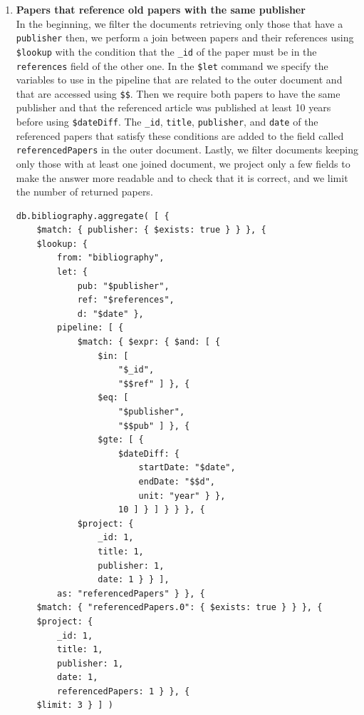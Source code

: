 \begin{enumerate}
\begin{figure}[H]
\begin{center}
            \label{fig:query8mongodb}%
        \end{center}
    \end{figure}
    \item \textbf{Papers that reference old papers with the same publisher} \\
    In the beginning, we filter the documents retrieving only those that have a \verb|publisher| then, we perform a join between papers and their references using \verb|$lookup| with the condition that the \verb|_id| of the paper must be in the \verb|references| field of the other one.
    In the \verb|$let| command we specify the variables to use in the pipeline that are related to the outer document and that are accessed using \verb|$$|.
    Then we require both papers to have the same publisher and that the referenced article was published at least 10 years before using \verb|$dateDiff|.
    The \verb|_id|, \verb|title|, \verb|publisher|, and \verb|date| of the referenced papers that satisfy these conditions are added to the field called \verb|referencedPapers| in the outer document.
    Lastly, we filter documents keeping only those with at least one joined document, we project only a few fields to make the answer more readable and to check that it is correct, and we limit the number of returned papers.
    \begin{lstlisting}[label={lst:query9mongodb}]
 db.bibliography.aggregate( [ {
    $match: { publisher: { $exists: true } } }, {
    $lookup: {
        from: "bibliography",
        let: {
            pub: "$publisher",
            ref: "$references",
            d: "$date" },
        pipeline: [ {
            $match: { $expr: { $and: [ {
                $in: [
                    "$_id",
                    "$$ref" ] }, {
                $eq: [
                    "$publisher",
                    "$$pub" ] }, {
                $gte: [ {
                    $dateDiff: {
                        startDate: "$date",
                        endDate: "$$d",
                        unit: "year" } },
                    10 ] } ] } } }, {
            $project: {
                _id: 1,
                title: 1,
                publisher: 1,
                date: 1 } } ],
        as: "referencedPapers" } }, {
    $match: { "referencedPapers.0": { $exists: true } } }, {
    $project: {
        _id: 1,
        title: 1,
        publisher: 1,
        date: 1,
        referencedPapers: 1 } }, {
    $limit: 3 } ] )
    \end{lstlisting}
    \begin{figure}[H]

\end{figure}
\end{enumerate}
